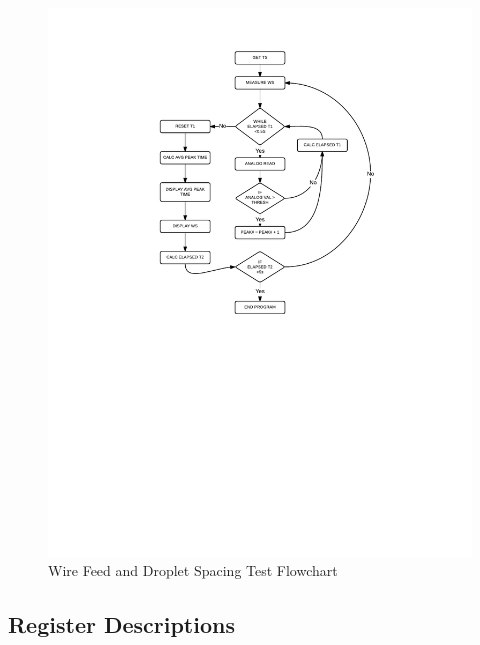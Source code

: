 \documentclass[12pt]{article}
\begin{document}
\begin{figure}[!h]
\centering
\includegraphics[scale=1.1]{droplet}
\caption{Wire Feed and Droplet Spacing Test Flowchart}
\end{figure}

\clearpage


\subsection{Register Descriptions}
\end{document}
